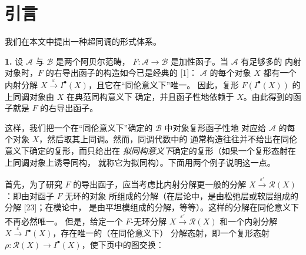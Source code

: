 \chapter*{引言}

我们在本文中提出一种超同调的形式体系。

\noindent\textbf{1.}\quad
设 $\mathcal A$ 与 $\mathcal B$ 是两个阿贝尔范畴，
$F:\mathcal A\to\mathcal B$ 是加性函子。当 $\mathcal A$ 有足够多的
内射对象时，$F$ 的右导出函子的构造如今已是经典的 [1]：
$\mathcal A$ 的每个对象 $X$ 都有一个内射分解
$X\xrightarrow{\varepsilon}I^{\bullet}(X)$，且它在“同伦意义下”唯一。
因此，复形 $F(I^{\bullet}(X))$ 的上同调对象由 $X$ 在典范同构意义下
确定，并且函子性地依赖于 $X$。由此得到的函子就是 $F$ 的右导出函子。

这样，我们把一个在“同伦意义下”确定的 $\mathcal B$ 中对象复形函子性地
对应给 $\mathcal A$ 的每个对象 $X$，然后取其上同调。然而，同调代数中的
通常构造往往并不给出在同伦意义下确定的复形，而只给出在
\emph{拟同构意义下}确定的复形（如果一个复形态射在上同调对象上诱导同构，
就称它为拟同构）。下面用两个例子说明这一点。

首先，为了研究 $F$ 的导出函子，应当考虑比内射分解更一般的分解
$X\xrightarrow{\varepsilon'}\mathcal R(X)$：即由对函子 $F$ 无环的对象
所组成的分解（在层论中，是由松弛层或软层组成的分解 [23]；在模论中，
是由平坦模组成的分解，等等）。这样的分解在同伦意义下不再必然唯一。
但是，给定一个 $F$-无环分解
$X\xrightarrow{\varepsilon'}\mathcal R(X)$ 和一个内射分解
$X\xrightarrow{\varepsilon}I^{\bullet}(X)$，存在唯一的（在同伦意义下）
分解态射，即一个复形态射
$\rho:\mathcal R(X)\to I^{\bullet}(X)$，使下页中的图交换：
